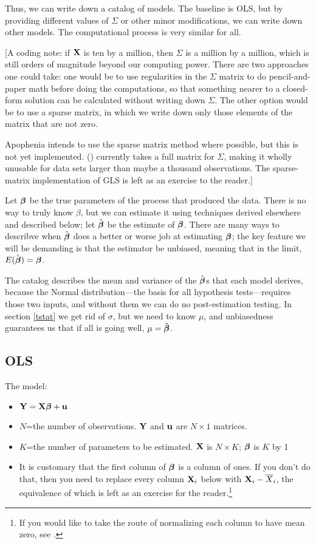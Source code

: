 Thus, we can write down a catalog of models. The baseline is OLS, but by
providing different values of $\Sigma$ or other minor modifications, we
can write down other models. The computational process is very similar
for all.

[A coding note: if ${\bf X}$ is ten by a million, then $\Sigma$ is a million
by a million, which is still orders of magnitude beyond our computing
power. There are two approaches one could take: one would be to use
regularities in the $\Sigma$ matrix to do pencil-and-paper math before
doing the computations, so that something nearer to a closed-form
solution can be calculated without writing down $\Sigma$. The other
option would be to use a sparse matrix, in which
we write down only those elements of the matrix that are not zero. 

Apophenia intends to use the sparse matrix method where possible, but this is not yet
implemented. () currently takes a full matrix
for $\Sigma$, making it wholly unusable for data sets larger than maybe a
thousand observations. The sparse-matrix implementation of GLS is
left as an exercise to the reader.]

Let ${\mbox{\boldmath$\beta$}}$ be the true parameters of the process that produced the
data. There is no way to truly know $\beta$, but we can estimate it
using techniques derived elsewhere and described below; let 
$\hat{{\mbox{\boldmath$\beta$}}}$ be the estimate of ${\mbox{\boldmath$\beta$}}$.  There are many ways to
describve when $\hat{{\mbox{\boldmath$\beta$}}}$ does a better or worse job at estimating 
${\mbox{\boldmath$\beta$}}$; the key feature we will be demanding is that the estimator be
unbiased, meaning that in the limit, $E(\hat{{\mbox{\boldmath$\beta$}}}) = {\mbox{\boldmath$\beta$}}$.

The catalog describes the mean and variance of the $\hat{{\mbox{\boldmath$\beta$}}}$s that
each model derives, because the Normal distribution---the basis for all
hypothesis tests---requires those two inputs,
and without them we can do no post-estimation testing.  
In section \ref{tstat} we get rid of $\sigma$, but we
need to know $\mu$, and unbiasedness guarantees us that if all is going
well, $\mu =\hat{{\mbox{\boldmath$\beta$}}}$.

\subsection{OLS}
The model: 
\begin{itemize}
\item ${\bf Y}={\bf X}{\mbox{\boldmath$\beta$}} + {\bf u}$
\item $N$=the number of observations. ${\bf Y}$ and ${\bf u}$ are $N \times 1$
matrices.
\item $K$=the number of parameters to be estimated. ${\bf X}$ is $N \times K$;
${\mbox{\boldmath$\beta$}}$ is $K$ by 1
\item It is customary that the first column of ${\mbox{\boldmath$\beta$}}$ is a column of
ones. If you don't do that, then you need to replace every column ${\bf X}_i$ below
with ${\bf X}_i-\overline X_i$, the equivalence of which is left as an exercise
for the reader.\footnote{If you would like to take the route of
normalizing each column to have mean zero, see
.}
\end{itemize}

